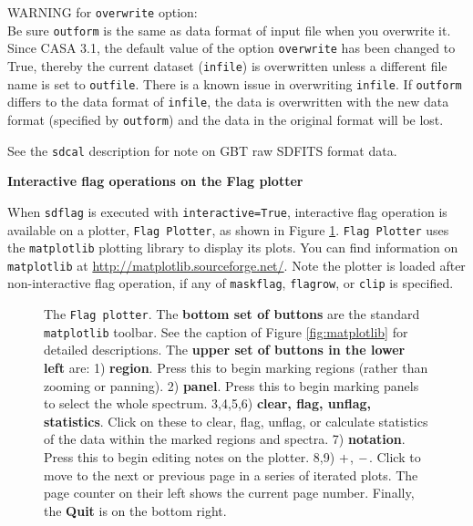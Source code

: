 WARNING for {\tt overwrite} option:\\
Be sure {\tt outform} is the same as data format of input file when you
overwrite it. Since CASA 3.1, the default value of the option {\tt overwrite}
has been changed to True, thereby the current dataset ({\tt infile}) is 
overwritten unless a different file name is set to {\tt outfile}. 
There is a known issue in overwriting {\tt infile}. If {\tt outform} differs to the
data format of {\tt infile}, the data is overwritten with the new data format 
(specified by {\tt outform}) and the data in the original format will be lost.

See the {\tt sdcal} description for note on GBT raw SDFITS format data.


\bigskip
{\bf Interactive flag operations on the Flag plotter}

When {\tt sdflag} is executed with {\tt interactive=True}, 
interactive flag operation is available on a plotter, {\tt Flag Plotter}, 
as shown in Figure \ref{fig:flagplotter}.
{\tt Flag Plotter} uses the {\tt matplotlib} plotting library to display 
its plots. You can find information on {\tt matplotlib} at
\url{http://matplotlib.sourceforge.net/}.
Note the plotter is loaded after non-interactive flag operation, 
if any of {\tt maskflag}, {\tt flagrow}, or {\tt clip} is specified.

\begin{figure}[h!]
\begin{center}
\caption{\label{fig:flagplotter} 
  The {\tt Flag plotter}.
  The {\bf bottom set of buttons} are the standard {\tt matplotlib} toolbar. 
  See the caption of Figure \ref{fig:matplotlib} for detailed descriptions.
  The {\bf upper set of buttons in the lower left} are:
  1) {\bf region}. Press this to begin marking regions (rather than
  zooming or panning).  
  2) {\bf panel}. Press this to begin marking panels to select the whole 
  spectrum.
  3,4,5,6) {\bf clear, flag, unflag, statistics}.  Click on these to clear, 
  flag, unflag, or calculate statistics of the data within the marked 
  regions and spectra.  
  7) {\bf notation}. Press this to begin editing notes on the plotter. 
  8,9) $ {\bf +} $, $ {\bf -} $. Click to move to the next or previous page in a series 
  of iterated plots. The page counter on their left shows the current page 
  number. Finally, the {\bf Quit} is on the bottom right.}
\hrulefill
\end{center}
\end{figure}

